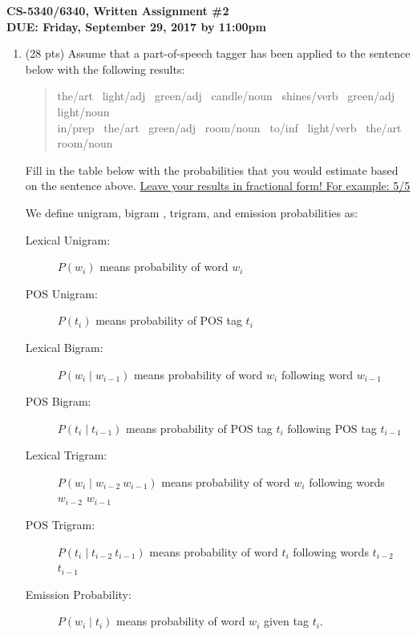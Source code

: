 \documentclass[11pt]{article}
\begin{document}
\large
\begin{center}
{\bf CS-5340/6340, Written Assignment \#2} \\
{\bf DUE: Friday, September 29, 2017 by 11:00pm}
\end{center}
\normalsize

\begin{enumerate}  

\item (28 pts) Assume that a part-of-speech tagger has been applied to the
sentence below with the following results:

\begin{quote}
the/{\sc art~}  light/{\sc adj~}  green/{\sc adj~} 
  candle/{\sc noun~}  shines/{\sc verb~}  green/{\sc adj~}
 light/{\sc noun~} \\  in/{\sc prep~}  the/{\sc art~} 
  green/{\sc adj~}  room/{\sc noun~}  to/{\sc inf~} 
  light/{\sc verb~}  the/{\sc art~}  room/{\sc noun~}
\end{quote}
\vspace*{.2in}

Fill in the table below with the probabilities that you would estimate
based on the sentence above. \underline{Leave your results in fractional
  form! For example: 5/5}

\vspace*{.1in}
We define unigram, bigram , trigram, and emission probabilities as:
\begin{description}
\item[Lexical Unigram:] $P(w_i)$ means probability of word $w_i$
\item[POS Unigram:] $P(t_i)$ means probability of POS tag $t_i$
\item[Lexical Bigram:] $P(w_i \mid w_{i-1})$ means probability of word
  $w_i$ following word $w_{i-1}$
\item[POS Bigram:] $P(t_i \mid t_{i-1})$ means probability of POS
  tag $t_i$ following POS tag $t_{i-1}$
\item[Lexical Trigram:] $P(w_i \mid w_{i-2}~w_{i-1})$ means probability of word
  $w_i$ following words $w_{i-2}$ $w_{i-1}$
\item[POS Trigram:] $P(t_i \mid t_{i-2}~t_{i-1})$ means probability of word
  $t_i$ following words $t_{i-2}$ $t_{i-1}$
\item[Emission Probability:] $P(w_i \mid t_i)$ means
  probability of word $w_i$ given tag $t_i$.
\end{description}



\end{enumerate}
\end{document}
